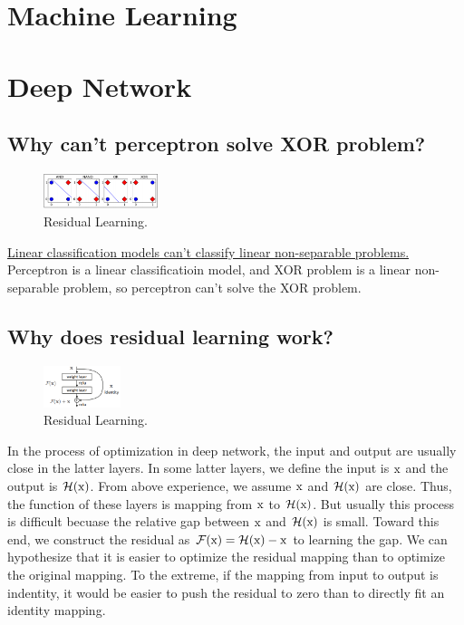 \documentclass[10pt,onecolumn]{book}
\begin{document}
\chapter{Machine Learning}

\chapter{Deep Network}
\section{Why can't perceptron solve XOR problem?}
\begin{figure}[h]
\centering
\includegraphics[width=0.3\textwidth]{figures/XOR_problem.png}
\caption{Residual Learning.}
\label{fig:1-1_residual_learning}
\end{figure}
 \uline{Linear classification models can't classify linear non-separable problems.} Perceptron is a linear classificatioin model, and XOR problem is a linear non-separable problem, so perceptron can't solve the XOR problem.

\section{Why does residual learning work?}
\begin{figure}[h]
\centering
\includegraphics[width=0.2\textwidth]{figures/residual_learning_block.png}
\caption{Residual Learning.}
\label{fig:1-1_residual_learning}
\end{figure}

In the process of optimization in deep network, the input and output are usually close in the latter layers. In some latter layers, we define the input is $\rm{x}$ and the output is $\mathcal{H(\rm{x})}$. From above experience, we assume $\rm{x}$ and $\mathcal{H(\rm{x})}$ are close. Thus, the function of these layers is mapping from $\rm{x}$ to $\mathcal{H(\rm{x})}$. But usually this process is difficult becuase the relative gap between $\rm{x}$ and $\mathcal{H(\rm{x})}$ is small. Toward this end, we construct the residual as \uline{$\mathcal{F(\rm{x})} = \mathcal{H(\rm{x})} - \rm{x}$} to learning the gap. We can hypothesize that it is easier to optimize the residual mapping than to optimize the original mapping. To the extreme, if the mapping from input to output is indentity, it would be easier to push the residual to zero than to directly fit an identity mapping.
\end{document}
